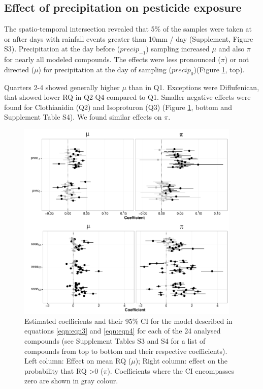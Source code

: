 \documentclass[journal=esthag,manuscript=article]{achemso}
\begin{document}
\subsection{Effect of precipitation on pesticide exposure}

The spatio-temporal intersection revealed that 5\% of the samples were taken at or after days with rainfall events greater than 10mm / day (Supplement, Figure S3).
Precipitation at the day before ($precip_{-1}$) sampling increased $\mu$ and also $\pi$ for nearly all modeled compounds. 
The effects were less pronounced ($\pi$) or not directed ($\mu$) for precipitation at the day of sampling ($precip_{0}$)(Figure \ref{fig:fig5}, top).

Quarters 2-4 showed generally higher $\mu$ than in Q1. 
Exceptions were Diflufenican, that showed lower RQ in Q2-Q4 compared to Q1.
Smaller negative effects were found for Clothianidin (Q2) and Isoproturon (Q3) (Figure \ref{fig:fig5}, bottom and Supplement Table S4).
We found similar effects on $\pi$. 

\begin{figure}[h]
  \includegraphics[width=0.95\textwidth]{figure5.pdf}
  \caption{Estimated coefficients and their 95\% CI for the model described in equations \ref{eqn:eqn3} and \ref{eqn:eqn4} for each of the 24 analysed compounds (see Supplement Tables S3 and S4 for a list of compounds from top to bottom and their respective coefficients). Left column: Effect on mean RQ ($\mu$); Right column: effect on the probability that RQ \textgreater 0 ($\pi$).
  Coefficients where the CI encompasses zero are shown in gray colour.
  }
  \label{fig:fig5}
\end{figure}
\end{document}

